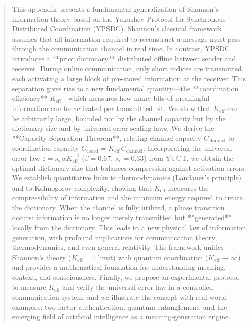 \documentclass[12pt,a4paper]{article}
\theoremstyle{remark}
\newcommand{\Keff}{K_{\mathrm{eff}}}
\begin{document}
\begin{titlepage}
\begin{center}
			\begin{minipage}{0.9\textwidth}
				\begin{abstract}
					\noindent
					This appendix presents a fundamental generalization of Shannon's information theory based on the Yakushev Protocol for Synchronous Distributed Coordination (YPSDC). Shannon's classical framework assumes that all information required to reconstruct a message must pass through the communication channel in real time. In contrast, YPSDC introduces a **prior dictionary** distributed offline between sender and receiver. During online communication, only short indices are transmitted, each activating a large block of pre‑stored information at the receiver. This separation gives rise to a new fundamental quantity—the **coordination efficiency** $\Keff$—which measures how many bits of meaningful information can be activated per transmitted bit. We show that $\Keff$ can be arbitrarily large, bounded not by the channel capacity but by the dictionary size and by universal error‑scaling laws. We derive the **Capacity Separation Theorem**, relating channel capacity $C_{\text{channel}}$ to coordination capacity $C_{\text{coord}} = \Keff \, C_{\text{channel}}$. Incorporating the universal error law $\varepsilon = \kappa_c\alpha \Keff^{-\beta}$ ($\beta=0.67$, $\kappa_c=0.33$) from YUCT, we obtain the optimal dictionary size that balances compression against activation errors. We establish quantitative links to thermodynamics (Landauer's principle) and to Kolmogorov complexity, showing that $\Keff$ measures the compressibility of information and the minimum energy required to create the dictionary. When the channel is fully utilized, a phase transition occurs: information is no longer merely transmitted but **generated** locally from the dictionary. This leads to a new physical law of information generation, with profound implications for communication theory, thermodynamics, and even general relativity. The framework unifies Shannon's theory ($\Keff=1$ limit) with quantum coordination ($\Keff\to\infty$) and provides a mathematical foundation for understanding meaning, context, and consciousness. Finally, we propose an experimental protocol to measure $\Keff$ and verify the universal error law in a controlled communication system, and we illustrate the concept with real‑world examples: two‑factor authentication, quantum entanglement, and the emerging field of artificial intelligence as a meaning‑generation engine.
				\end{abstract}
			\end{minipage}
			

\end{center}
\end{titlepage}
\end{document}
